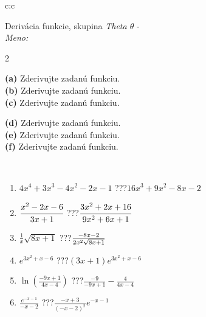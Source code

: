 \documentclass[10pt]{report}
\begin{document}
\newpage
\thispagestyle{empty}
\begin{tabular}{c:c}
\begin{minipage}[c][104.5mm][t]{0.5\linewidth}
\begin{center}
\vspace{7mm}
{\huge Derivácia funkcie, skupina \textit{Theta $\theta$} -}\\[5mm]
\textit{Meno:}\phantom{xxxxxxxxxxxxxxxxxxxxxxxxxxxxxxxxxxxxxxxxxxxxxxxxxxxxxxxxxxxxxxxxx}\\[5mm]
\begin{minipage}{0.95\linewidth}
\begin{center}
{\small \begin{multicols}{2} \raggedright
\textbf{(a)} Zderivujte zadanú funkciu. \\[1mm]
\textbf{(b)} Zderivujte zadanú funkciu. \\[1mm]
\textbf{(c)} Zderivujte zadanú funkciu. \par \columnbreak
\textbf{(d)} Zderivujte zadanú funkciu. \\[1mm]
\textbf{(e)} Zderivujte zadanú funkciu. \\[1mm]
\textbf{(f)} Zderivujte zadanú funkciu.
\end{multicols}
}
\end{center}
\end{minipage}
\\[4mm]
\begin{minipage}{0.79\linewidth}
\begin{center}
\begin{varwidth}{\linewidth}
\begin{enumerate}
\normalsize
\item $4x^4+3x^3-4x^2-2x-1$\quad \dotfill\; ???\;\dotfill \quad $16x^3+9x^2-8x-2$
\item $\cfrac{x^2-2x-6}{3x+1}$\quad \dotfill\; ???\;\dotfill \quad $\cfrac{3x^2+2x+16}{9x^2+6x+1}$
\item $\frac{1}{x}\sqrt{8x+1}$\quad \dotfill\; ???\;\dotfill \quad $\frac{-8x-2}{2x^2 \sqrt{\smash[b]{8x+1}}}$
\item $e^{3x^2+x-6}$\quad \dotfill\; ???\;\dotfill \quad $(3x+1)e^{3x^2+x-6}$
\item $\ln{\left(\frac{-9x+1}{4x-4}\right)}$\quad \dotfill\; ???\;\dotfill \quad $\frac{-9}{-9x+1}-\frac{4}{4x-4}$
\item $\frac{e^{-x-1}}{-x-2}$\quad \dotfill\; ???\;\dotfill \quad $\frac{-x+3}{(-x-2)^2}e^{-x-1}$
\end{enumerate}

\end{varwidth}
\end{center}
\end{minipage}
\end{center}
\end{minipage}
\end{tabular}
\end{document}
